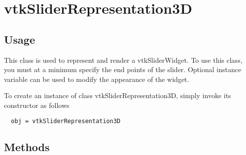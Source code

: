 \section{vtkSliderRepresentation3D}

\subsection{Usage}

 This class is used to represent and render a vtkSliderWidget. To use this
 class, you must at a minimum specify the end points of the
 slider. Optional instance variable can be used to modify the appearance of
 the widget.


To create an instance of class vtkSliderRepresentation3D, simply
invoke its constructor as follows
\begin{verbatim}
  obj = vtkSliderRepresentation3D
\end{verbatim}
\subsection{Methods}

